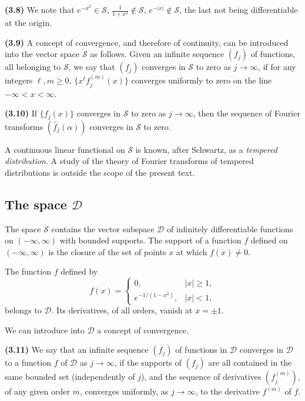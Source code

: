 \noindent\textbf{(3.8)} We note that $e^{-x^2}\in\mathcal S$, $\frac{1}{1+x^2}\notin\mathcal S$, $e^{-|x|}\notin\mathcal S$, the last not being differentiable at the origin.

\noindent\textbf{(3.9)} A concept of convergence, and therefore of continuity, can be introduced into the vector space $\mathcal S$ as follows. Given an infinite sequence $(f_j)$ of functions, all belonging to $\mathcal S$, we say that $(f_j)$ converges in $\mathcal S$ to zero as $j\to\infty$, if for any integers $\ell,m\ge 0$, $\{x^\ell f_j^{(m)}(x)\}$ converges uniformly to zero on the line $-\infty<x<\infty$.

\noindent\textbf{(3.10)} If $\{f_j(x)\}$ converges in $\mathcal S$ to zero as $j\to\infty$, then the sequence of Fourier transforms $(\hat f_j(\alpha))$ converges in $\mathcal S$ to zero.

A continuous linear functional on $\mathcal S$ is known, after Schwartz, as a \emph{tempered distribution}. A study of the theory of Fourier transforms of tempered distributions is outside the scope of the present text.

\subsection*{The space $\mathcal D$}
The space $\mathcal S$ contains the vector subspace $\mathcal D$ of infinitely differentiable functions on $(-\infty,\infty)$ with bounded supports. The support of a function $f$ defined on $(-\infty,\infty)$ is the closure of the set of points $x$ at which $f(x)\neq 0$.

The function $f$ defined by
\begin{equation*}
f(x)=
\begin{cases}
0,&|x|\ge 1,\\
e^{-1/(1-x^2)},&|x|<1,
\end{cases}
\end{equation*}
belongs to $\mathcal D$. Its derivatives, of all orders, vanish at $x=\pm 1$.

We can introduce into $\mathcal D$ a concept of convergence.

\noindent\textbf{(3.11)} We say that an infinite sequence $(f_j)$ of functions in $\mathcal D$ converges in $\mathcal D$ to a function $f$ of $\mathcal D$ as $j\to\infty$, if the supports of $(f_j)$ are all contained in the same bounded set (independently of $j$), and the sequence of derivatives $(f_j^{(m)})$, of any given order $m$, converges uniformly, as $j\to\infty$, to the derivative $f^{(m)}$ of $f$.

